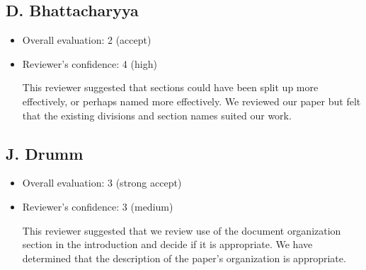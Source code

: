 \documentclass{article}
\begin{document}
\subsection{D. Bhattacharyya}
\begin{itemize}
    \item Overall evaluation: 2 (accept)
    \item Reviewer's confidence: 4 (high)

This reviewer suggested that sections could have been split up more effectively, or perhaps named more effectively. We reviewed our paper but felt that the existing divisions  and section names suited our work.

\end{itemize}

\subsection{J. Drumm}
\begin{itemize}
    \item Overall evaluation: 3 (strong accept)
    \item Reviewer's confidence: 3 (medium)

This reviewer suggested that we review use of the document organization section in the introduction and decide if it is appropriate. We have determined that the description of the paper's organization is appropriate.

\end{itemize}
\end{document}

